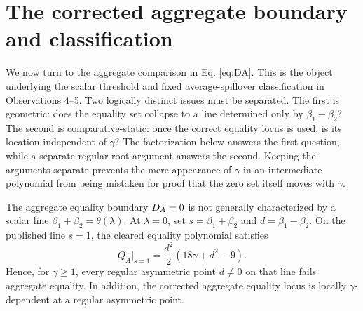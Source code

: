 \section{The corrected aggregate boundary and classification}

We now turn to the aggregate comparison in Eq. \eqref{eq:DA}. This is the object underlying the scalar threshold and fixed average-spillover classification in Observations 4--5. Two logically distinct issues must be separated. The first is geometric: does the equality set collapse to a line determined only by $\beta_1+\beta_2$? The second is comparative-static: once the correct equality locus is used, is its location independent of $\gamma$? The factorization below answers the first question, while a separate regular-root argument answers the second. Keeping the arguments separate prevents the mere appearance of $\gamma$ in an intermediate polynomial from being mistaken for proof that the zero set itself moves with $\gamma$.

\begin{proposition}\label{prop:aggregate}
The aggregate equality boundary $D_A=0$ is not generally characterized by a scalar line $\beta_1+\beta_2=\theta(\lambda)$. At $\lambda=0$, set $s=\beta_1+\beta_2$ and $d=\beta_1-\beta_2$. On the published line $s=1$, the cleared equality polynomial satisfies
\begin{equation}\label{eq:aggfactor}
 Q_A\big|_{s=1}=\frac{d^2}{2}(18\gamma+d^2-9).
\end{equation}
Hence, for $\gamma\geq1$, every regular asymmetric point $d\neq0$ on that line fails aggregate equality. In addition, the corrected aggregate equality locus is locally $\gamma$-dependent at a regular asymmetric point.
\end{proposition}


